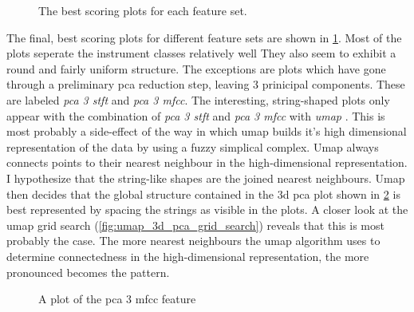 \documentclass[11pt]{article}
\begin{document}
\begin{figure}[htbp]
\centering
{}
\caption{\label{fig:best_overall}The best scoring plots for each feature set.}
\end{figure}

The final, best scoring plots for different feature sets are shown in \ref{fig:best_overall}. Most of the plots seperate the instrument classes relatively well They also seem to exhibit a round and fairly uniform structure. The exceptions are plots which have gone through a preliminary pca reduction step, leaving 3 prinicipal components. These are labeled \textit{pca 3 stft} and \textit{pca 3 mfcc}. The interesting, string-shaped plots only appear with the combination of \textit{ pca 3 stft } and \textit{ pca 3 mfcc } with \textit{ umap }. This is most probably a side-effect of the way in which umap builds it's high dimensional representation of the data by using a fuzzy simplical complex. Umap always connects points to their nearest neighbour in the high-dimensional representation. I hypothesize that the string-like shapes are the joined nearest neighbours. Umap then decides that the global structure contained in the 3d pca plot shown in \ref{fig:3d_pca} is best represented by spacing the strings as visible in the plots. A closer look at the umap grid search (\ref{fig:umap_3d_pca_grid_search}) reveals that this is most probably  the case. The more nearest neighbours the umap algorithm uses to determine connectedness in the high-dimensional representation, the more pronounced becomes the pattern.

\begin{figure}[hb]
\centering
{}
\caption{\label{fig:3d_pca}A plot of the pca 3 mfcc feature}
\end{figure}
\end{document}
